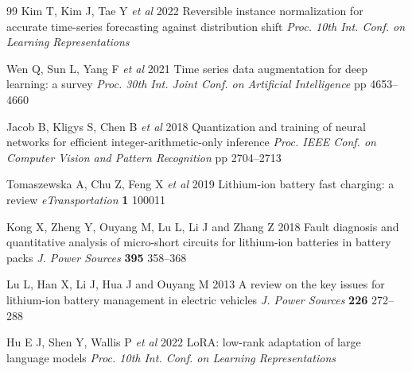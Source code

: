 \documentclass{iopjournal}
\begin{document}
\begin{thebibliography}{99}
 Kim T, Kim J, Tae Y \textit{et al} 2022 Reversible instance normalization for accurate time-series forecasting against distribution shift \textit{Proc. 10th Int. Conf. on Learning Representations}

 Wen Q, Sun L, Yang F \textit{et al} 2021 Time series data augmentation for deep learning: a survey \textit{Proc. 30th Int. Joint Conf. on Artificial Intelligence} pp 4653--4660

 Jacob B, Kligys S, Chen B \textit{et al} 2018 Quantization and training of neural networks for efficient integer-arithmetic-only inference \textit{Proc. IEEE Conf. on Computer Vision and Pattern Recognition} pp 2704--2713

 Tomaszewska A, Chu Z, Feng X \textit{et al} 2019 Lithium-ion battery fast charging: a review \textit{eTransportation} \textbf{1} 100011

 Kong X, Zheng Y, Ouyang M, Lu L, Li J and Zhang Z 2018 Fault diagnosis and quantitative analysis of micro-short circuits for lithium-ion batteries in battery packs \textit{J. Power Sources} \textbf{395} 358--368

 Lu L, Han X, Li J, Hua J and Ouyang M 2013 A review on the key issues for lithium-ion battery management in electric vehicles \textit{J. Power Sources} \textbf{226} 272--288

 Hu E J, Shen Y, Wallis P \textit{et al} 2022 LoRA: low-rank adaptation of large language models \textit{Proc. 10th Int. Conf. on Learning Representations}
\end{thebibliography}
\endgroup
\end{document}
